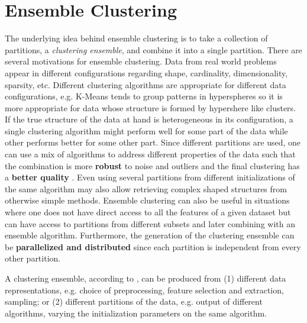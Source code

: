 %
%

\section{Ensemble Clustering}
\label{sec:ensemble}

The underlying idea behind ensemble clustering is to take a collection of partitions, a \emph{clustering ensemble}, and combine it into a single partition.
There are several motivations for ensemble clustering.
Data from real world problems appear in different configurations regarding shape, cardinality, dimensionality, sparsity, etc. 
Different clustering algorithms are appropriate for different data configurations, e.g. K-Means tends to group patterns in hyperspheres \cite{Jain1999} so it is more appropriate for data whose structure is formed by hypershere like clusters.
If the true structure of the data at hand is heterogeneous in its configuration, a single clustering algorithm might perform well for some part of the data while other performs better for some other part.
Since different partitions are used, one can use a mix of algorithms to address different properties of the data such that the combination is more \textbf{robust} to noise and outliers \cite{topchy2004mixture} and the final clustering has a \textbf{better quality} \cite{Aggarwal2014}.
Even using several partitions from different initializations of the same algorithm may also allow retrieving complex shaped structures from otherwise simple methods.
Ensemble clustering can also be useful in situations where one does not have direct access to all the features of a given dataset but can have access to partitions from different subsets and later combining with an ensemble algorithm.
Furthermore, the generation of the clustering ensemble can be \textbf{parallelized and distributed} since each partition is independent from every other partition.

A clustering ensemble, according to \cite{Fred2005}, can be produced from (1) different data representations, e.g. choice of preprocessing, feature selection and extraction, sampling; or (2) different partitions of the data, e.g. output of different algorithms, varying the initialization parameters on the same algorithm.

